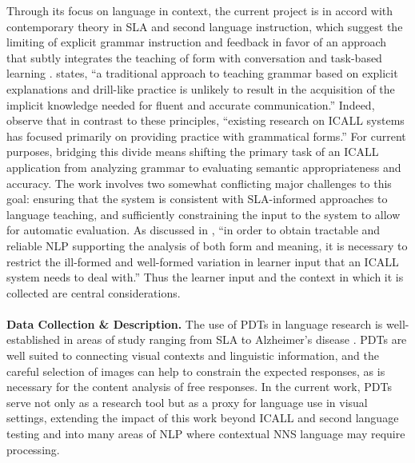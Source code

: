 Through its focus on language in context, the current project is in accord with contemporary theory in SLA and second language instruction, which suggest the limiting of explicit grammar instruction and feedback in favor of an approach that subtly integrates the teaching of form with conversation and task-based learning \citep{CelceMurcia:1991:GrammarPedagogy, CelceMurcia:2002:GrammarThroughContext, LarsenFreeman:1991:TeachingGrammar}. \citet{Ellis:2006:CurrentIssues} states, ``a traditional approach to teaching grammar based on explicit explanations and drill-like practice is unlikely to result in the acquisition of the implicit knowledge needed for fluent and accurate communication.'' Indeed, \citet{bailey:meurers:08} observe that in contrast to these principles, ``existing research on ICALL systems has focused primarily on providing practice with grammatical forms.'' For current purposes, bridging this divide means shifting the primary task of an ICALL application from analyzing grammar to evaluating semantic appropriateness and accuracy. The work involves two somewhat conflicting major challenges to this goal: ensuring that the system is consistent with SLA-informed approaches to language teaching, and sufficiently constraining the input to the system to allow for automatic evaluation. As discussed in \citet{Amaral.Meurers-11}, ``in order to obtain tractable and reliable NLP supporting the analysis of both form and meaning, it is necessary to restrict the ill-formed and well-formed variation in learner input that an ICALL system needs to deal with.'' Thus the learner input and the context in which it is collected are central considerations.\\
\\
\textbf{Data Collection \& Description.} The use of PDTs in language research is well-established in areas of study ranging from SLA to Alzheimer's disease \citep{ellis2000task, forbes2005detecting}. PDTs are well suited to connecting visual contexts and linguistic information, and the careful selection of images can help to constrain the expected responses, as is necessary for the content analysis of free responses. In the current work, PDTs serve not only as a research tool but as a proxy for language use in visual settings, extending the impact of this work beyond ICALL and second language testing and into many areas of NLP where contextual NNS language may require processing.
